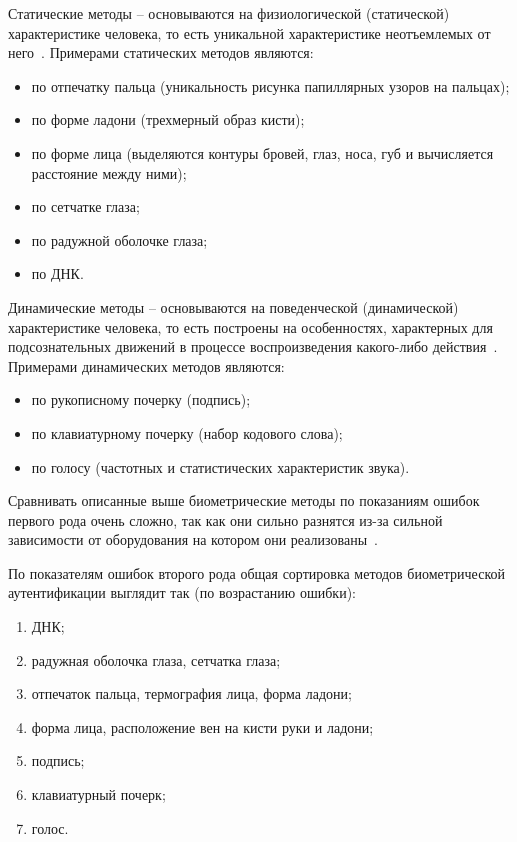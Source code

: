 Статические методы -- основываются на физиологической (статической) характеристике человека, то есть уникальной характеристике неотъемлемых от него~\cite{prohorov}.
Примерами статических методов являются:
\begin{itemize}
  \item по отпечатку пальца (уникальность рисунка папиллярных узоров на пальцах);
  \item по форме ладони (трехмерный образ кисти);
  \item по форме лица (выделяются контуры бровей, глаз, носа, губ и вычисляется расстояние между ними);
  \item по сетчатке глаза;
  \item по радужной оболочке глаза;
  \item по ДНК.
\end{itemize}

Динамические методы -- основываются на поведенческой (динамической) характеристике человека, то есть построены на особенностях, характерных для подсознательных движений в процессе воспроизведения какого-либо действия~\cite{habr_bio_auth}.
Примерами динамических методов являются:
\begin{itemize}
  \item по рукописному почерку (подпись);
  \item по клавиатурному почерку (набор кодового слова);
  \item по голосу (частотных и статистических характеристик звука).
\end{itemize}
Сравнивать описанные выше биометрические методы по показаниям ошибок первого рода очень сложно, так как они сильно разнятся из-за сильной зависимости от оборудования на котором они реализованы~\cite{lorette_plamondon}.

По показателям ошибок второго рода общая сортировка методов биометрической аутентификации выглядит так (по возрастанию ошибки):
\begin{enumerate}
  \item ДНК;
  \item радужная оболочка глаза, сетчатка глаза;
  \item отпечаток пальца, термография лица, форма ладони;
  \item форма лица, расположение вен на кисти руки и ладони;
  \item подпись;
  \item клавиатурный почерк;
  \item голос.
\end{enumerate}


